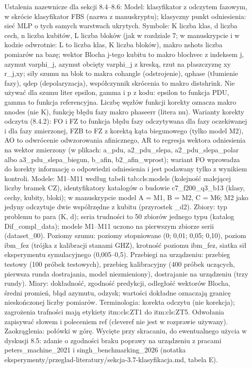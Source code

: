 {Ustalenia nazewnicze dla sekcji 8.4--8.6:
Model: klasyfikator z odczytem fazowym, w skrócie klasyfikator FBS (nazwa z manuskryptu); klasyczny punkt odniesienia: sieć MLP o tych samych warstwach ukrytych.
Symbole: K liczba klas, d liczba cech, n liczba kubitów, L liczba bloków (jak w rozdziale 7; w manuskrypcie i w kodzie odwrotnie: L to liczba klas, K liczba bloków), makro nshots liczba pomiarów na bazę; wektor Blocha j-tego kubitu to makro blochvec z indeksem j, azymut varphi_j, azymut obcięty varphi_j z kreską, rzut na płaszczyznę xy r_{j,xy}; siły szumu na blok to makra cohangle (odstrojenie), qphase (tłumienie fazy), qdep (depolaryzacja), współczynnik skrócenia to makro distshrink.
Nie używać dla szumu liter epsilon, gamma i p z kodu: epsilon to funkcja PDU, gamma to funkcja referencyjna. Liczbę węzłów funkcji korekty oznacza makro nnodes (nie K), funkcję błędu fazy makro phaseerr (litera nu).
Warianty korekty odczytu (8.4.2): FO i FZ to funkcja błędu fazy odczytywana dla fazy oczekiwanej i dla fazy zmierzonej, FZB to FZ z korektą kąta biegunowego (tylko model M2), AO to odwrócenie odwzorowania afinicznego, AR to regresja wektora odniesienia na wektor zmierzony (w plikach: a_pdu, a2_pdu_slepa, a2_pdu_slepa_polar albo a3_pdu_slepa_biegun, b_afin, b2_afin_wprost); wariant FO wprowadza do korekty informację o odpowiedzi odniesienia i jest podawany tylko z wynikiem kontroli.
Modele: M1--M11 według tabeli tab:cls:models (kolejność malejącej liczby bramek CZ), identyfikatory katalogów o budowie c7_f200_q3_b13 (klasy, cechy, kubity, bloki); w manuskrypcie model A = M1, B = M2, C = M6; M2 jako jedyny odczytuje dwie współrzędne z kubitu (przyrostek _d2).
Zbiory: typ problemu to para (K, d); seria trudności to 50 zbiorów jednego typu (katalog Dif_compl_data); modele M1--M11 uczono na pierwszym zbiorze serii (dataset_00).
Poziomy szumu: poziomy stopniowane (0; 0,01; 0,05; 0,10), poziom ibm_fez (trójka z kalibracji stanami GHZ), krotność poziomu ibm_fez, siatka sił eksperymentu symulacyjnego (0,005--0,5).
Przebiegi na urządzeniu: przebieg testowy (100 próbek testowych), przebieg kalibracyjny (400 próbek uczących, pierwsza runda dostrajania, model niezmieniony), dostrajanie na urządzeniu (trzy rundy).
Miary: dokładność, zgodność predykcji, odległość wektorów Blocha, średni promień, błąd azymutu, odzysk; wartości dokładne oznaczają granicę nieskończonej liczby pomiarów.
Terminologia: korekta odczytu (nie korekcja); zagrożenia trafności mają etykiety itm:cls:ZT1 do itm:cls:ZT5.
Odwołania zapisywać słowem i poleceniem ref (cleveref nie jest w rozprawie używany). Zaokrąglenia: połówki w górę.
Wycięte przy skracaniu, do ewentualnego użycia w dyskusji 8.5: zdanie o zgodności braku poprawy na urządzeniu z pracami peters_machine_2021 i singh_benchmarking_2026 (notatka eksperymenty/przeglad-literatury/sekcja-3.7-klasyfikacja.md, tabela E).
}

